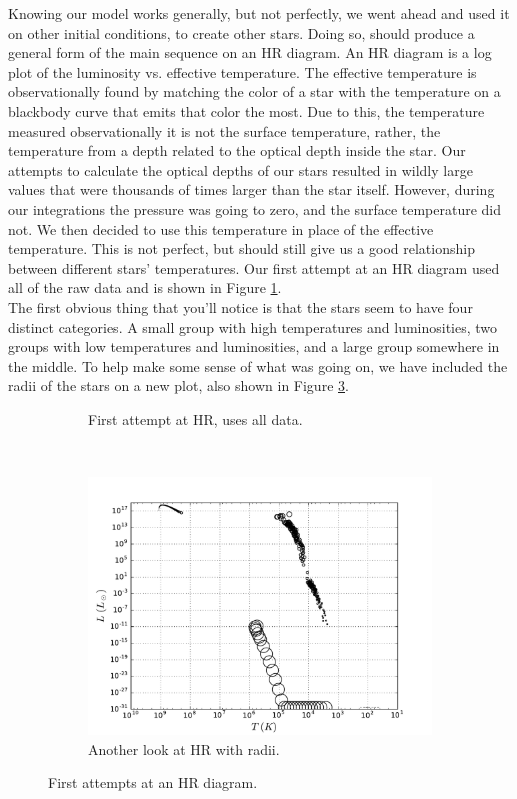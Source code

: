 \documentclass[10pt]{article}
\begin{document}
Knowing our model works generally, but not perfectly, we went ahead and used it on other initial conditions, to create other stars. Doing so, should produce a general form of the main sequence on an HR diagram. An HR diagram is a log plot of the luminosity vs. effective temperature. The effective temperature is observationally found by matching the color of a star with the temperature on a blackbody curve that emits that color the most. Due to this, the temperature measured observationally it is not the surface temperature, rather, the temperature from a depth related to the optical depth inside the star. Our attempts to calculate the optical depths of our stars resulted in wildly large values that were thousands of times larger than the star itself. However, during our integrations the pressure was going to zero, and the surface temperature did not. We then decided to use this temperature in place of the effective temperature. This is not perfect, but should still give us a good relationship between different stars' temperatures. Our first attempt at an HR diagram used all of the raw data and is shown in Figure \ref{fig:badHR}. \\

The first obvious thing that you'll notice is that the stars seem to have four distinct categories. A small group with high temperatures and luminosities, two groups with low temperatures and luminosities, and a large group somewhere in the middle. To help make some sense of what was going on, we have included the radii of the stars on a new plot, also shown in Figure \ref{fig:nosobadHR}. \\

\begin{figure}[p]
\centering
\begin{subfigure}{\textwidth}
\centering

\caption{First attempt at HR, uses all data.}
\label{fig:badHR}
\end{subfigure} \\
\begin{subfigure}{\textwidth}
\centering
\includegraphics[height=0.4\textheight]{new_bad_hr.pdf}
\caption{Another look at HR with radii.}
\label{fig:nosobadHR}
\end{subfigure}
\caption{First attempts at an HR diagram.}
\end{figure}
\end{document}

